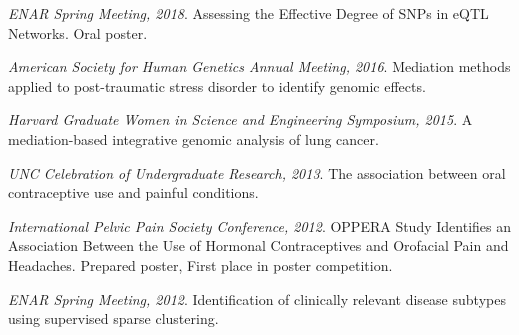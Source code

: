\vspace{-6mm}

\begin{cventries}
    
    \cventry
    {} %
    {} %
    {} %
    {} %
    {
      \begin{cvitems} %
\item \textit{ENAR Spring Meeting, 2018}. Assessing the Effective Degree of SNPs in eQTL Networks. Oral poster.
\item \textit{American Society for Human Genetics Annual Meeting,  2016}. Mediation methods applied to post-traumatic stress disorder to identify genomic effects.
\item \textit{Harvard Graduate Women in Science and Engineering Symposium,  2015}. A mediation-based integrative genomic analysis of lung cancer.
\item \textit{UNC Celebration of Undergraduate Research,  2013}. The association between oral contraceptive use and painful conditions.
\item \textit{International Pelvic Pain Society Conference,  2012}. OPPERA Study Identifies an Association Between the Use of Hormonal Contraceptives and Orofacial Pain and Headaches. Prepared poster, First place in poster competition.
\item \textit{ENAR Spring Meeting, 2012}. Identification of clinically relevant disease subtypes using supervised sparse clustering.
      \end{cvitems}
    }
\end{cventries}

